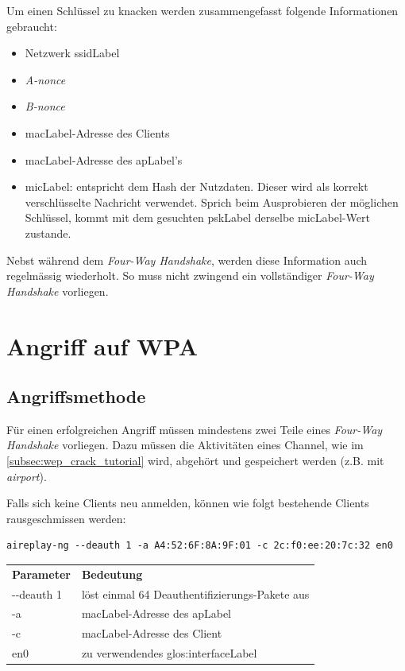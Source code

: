 
Um einen Schlüssel zu knacken werden zusammengefasst folgende Informationen gebraucht:
\begin{itemize}
	\item Netzwerk \gls{ssidLabel}
	\item \textit{A-nonce}
	\item \textit{B-nonce}
	\item \gls{macLabel}-Adresse des Clients
	\item \gls{macLabel}-Adresse des \gls{apLabel}'s
	\item \gls{micLabel}: entspricht dem Hash der Nutzdaten. Dieser wird als korrekt verschlüsselte Nachricht verwendet. Sprich beim Ausprobieren der möglichen Schlüssel, kommt mit dem gesuchten \gls{pskLabel} derselbe \gls{micLabel}-Wert zustande.
\end{itemize}

Nebst während dem \textit{Four-Way Handshake}, werden diese Information auch regelmässig wiederholt.
So muss nicht zwingend ein vollständiger \textit{Four-Way Handshake} vorliegen.


\section{Angriff auf WPA}

\subsection{Angriffsmethode}
Für einen erfolgreichen Angriff müssen mindestens zwei Teile eines \textit{Four-Way Handshake} vorliegen.
Dazu müssen die Aktivitäten eines Channel, wie im \cref{subsec:wep_crack_tutorial} wird, abgehört und gespeichert werden (z.B. mit \textit{airport}).

Falls sich keine Clients neu anmelden, können wie folgt bestehende Clients rausgeschmissen werden:
\begin{lstlisting}[style=lstStyleFramed]
aireplay-ng --deauth 1 -a A4:52:6F:8A:9F:01 -c 2c:f0:ee:20:7c:32 en0
\end{lstlisting}
\begin{tabular}{l l}
	\textbf{Parameter} & \textbf{Bedeutung}\\
	-{}-deauth 1 & löst einmal 64 Deauthentifizierungs-Pakete aus\\
	-a	& \gls{macLabel}-Adresse des \gls{apLabel}\\
	-c	& \gls{macLabel}-Adresse des Client\\
	en0 & zu verwendendes \gls{glos:interfaceLabel}
\end{tabular}

